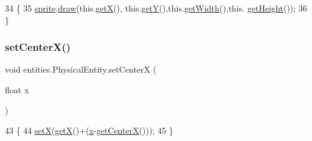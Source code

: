 \begin{DoxyCode}
34                                                      \{
35         \mbox{\hyperlink{classentities_1_1_physical_entity_aeb439b2308ab19fb6d3ff6be6f7cdbd8}{sprite}}.\mbox{\hyperlink{classorg_1_1newdawn_1_1slick_1_1_image_a9bddcca05c7140ab45df8ac5b250b6cd}{draw}}(this.\mbox{\hyperlink{classorg_1_1newdawn_1_1slick_1_1geom_1_1_shape_a736a47bfdd6f164558b43fd497a3a3f3}{getX}}(), this.\mbox{\hyperlink{classorg_1_1newdawn_1_1slick_1_1geom_1_1_shape_a5f334f962d8fc525d522fe0f8ac20b35}{getY}}(),this.\mbox{\hyperlink{classorg_1_1newdawn_1_1slick_1_1geom_1_1_rectangle_ae2fddc33461303a9ccf8854c1e93c9c1}{getWidth}}(),this.
      \mbox{\hyperlink{classorg_1_1newdawn_1_1slick_1_1geom_1_1_rectangle_a6c8878e73b4ca0d7a3c2d4e6bcd421ee}{getHeight}}());
36     \}
\end{DoxyCode}
\mbox{\label{classentities_1_1_physical_entity_aec517c801823101f42e990157de42780}} 
\subsubsection{\texorpdfstring{set\+Center\+X()}{setCenterX()}}
{\footnotesize\ttfamily void entities.\+Physical\+Entity.\+set\+CenterX (\begin{DoxyParamCaption}\item[{float}]{x }\end{DoxyParamCaption})\hspace{0.3cm}{\ttfamily [inline]}}


\begin{DoxyCode}
43                                    \{
44         \mbox{\hyperlink{classorg_1_1newdawn_1_1slick_1_1geom_1_1_shape_a1469b8ef682642c4257869640c27bf16}{setX}}(\mbox{\hyperlink{classorg_1_1newdawn_1_1slick_1_1geom_1_1_shape_a736a47bfdd6f164558b43fd497a3a3f3}{getX}}()+(\mbox{\hyperlink{classorg_1_1newdawn_1_1slick_1_1geom_1_1_shape_a3e985bfff386c15a4efaad03d8ad60d3}{x}}-\mbox{\hyperlink{classentities_1_1_physical_entity_ac084d1d2c3b6f810826b52ce42012a82}{getCenterX}}()));
45     \}
\end{DoxyCode}
\mbox{\label{classentities_1_1_physical_entity_a97e4905f6a7806046dd2a9b96ca43e31}} 
